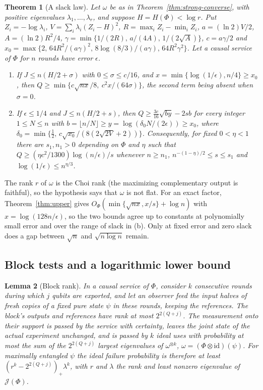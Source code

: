\documentclass[11pt,a4paper]{article}
\theoremstyle{plain}
\newtheorem{theorem}{Theorem}[section]
\newtheorem{lemma}[theorem]{Lemma}
\theoremstyle{definition}
\theoremstyle{remark}
\begin{document}
\begin{theorem}[A slack law]\label{thm:slack}
Let $\omega$ be as in Theorem~\ref{thm:strong-converse}, with positive eigenvalues $\lambda_1,\dots,\lambda_r$, and suppose $H=H(\Phi)<\log r$.
Put $Z_i=-\log\lambda_i$, $V=\sum_i\lambda_i(Z_i-H)^2$, $R=\max_iZ_i-\min_iZ_i$, $a=(\ln2)V/2$, $A=(\ln2)R^2/4$,
$\gamma=\min\{1/(2R),\,a/(4A),\,1/(2\sqrt A)\}$, $c=a\gamma/2$ and $x_0=\max\{2,\,64R^2/(a\gamma)^2,\,8\log(8/3)/(a\gamma),\,64R^2\gamma^2\}$.
Let a causal service of $\Phi$ for $n$ rounds have error $\epsilon$.
\begin{enumerate}[label=(\alph*)]
\item If $J\le n(H/2+\sigma)$ with $0\le\sigma\le c/16$, and $x=\min\{\log(1/\epsilon),n/4\}\ge x_0$, then
$Q\ge\min\{c\sqrt{nx}/8,\ c^2x/(64\sigma)\}$, the second term being absent when $\sigma=0$.
\item If $\epsilon\le1/4$ and $J\le n(H/2+s)$, then $Q\ge\frac{3c}{16}\sqrt{by}-2sb$ for every integer $1\le N\le n$ with
$b=\lfloor n/N\rfloor\ge y=\log(\delta_0N/(2\epsilon))\ge x_0$, where $\delta_0=\min\{\frac12,\,c\sqrt{x_0}/(8(2\sqrt{2V}+2))\}$.
Consequently, for fixed $0<\eta<1$ there are $s_1,n_1>0$ depending on $\Phi$ and $\eta$ such that
$Q\ge(\eta c^2/1300)\log(n/\epsilon)/s$ whenever $n\ge n_1$, $n^{-(1-\eta)/2}\le s\le s_1$ and $\log(1/\epsilon)\le n^{\eta/3}$.
\end{enumerate}
\end{theorem}

The rank $r$ of $\omega$ is the Choi rank (the maximizing complementary output is faithful), so the hypothesis says that $\omega$ is
not flat. For an exact factor, Theorem~\ref{thm:upper} gives $O_\Phi(\min\{\sqrt{nx},x/s\}+\log n)$ with $x=\log(128n/\epsilon)$, so
the two bounds agree up to constants at polynomially small error and over the range of slack in (b). Only at fixed error and
zero slack does a gap between $\sqrt n$ and $\sqrt{n\log n}$ remain.


\subsection{Block tests and a logarithmic lower bound}

\begin{lemma}[Block rank]\label{lem:block}
In a causal service of $\Phi$, consider $k$ consecutive rounds during which $j$ qubits are exported, and let an observer feed the
input halves of fresh copies of a fixed pure state $\psi$ in these rounds, keeping the references. The block's outputs and
references have rank at most $2^{2(Q+j)}$. The measurement onto their support is passed by the service with certainty, leaves
the joint state of the actual experiment unchanged, and is passed by $k$ ideal uses with probability at most the sum of the
$2^{2(Q+j)}$ largest eigenvalues of $\omega^{\otimes k}$, $\omega=(\Phi\otimes\mathrm{id})(\psi)$. For maximally entangled $\psi$ the ideal
failure probability is therefore at least $(r^k-2^{2(Q+j)})_+\lambda^k$, with $r$ and $\lambda$ the rank and least nonzero eigenvalue
of $\mathcal J(\Phi)$.
\end{lemma}
\end{document}
